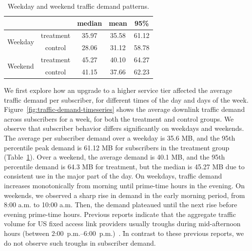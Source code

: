\begin{table}[t]
\centering
\begin{tabular}{ cc | ccc }\\\hline
                         &           & median & mean  & 95\%  \\\hline
\multirow{2}{*}{Weekday} & treatment & 35.97  & 35.58 & 61.12 \\
                         & control   & 28.06  & 31.12 & 58.78 \\\hline
\multirow{2}{*}{Weekend} & treatment & 45.27  & 40.10 & 64.27 \\
                         & control   & 41.15  & 37.66 & 62.23 \\\hline
\end{tabular}
\caption{Weekday and weekend traffic demand patterns.}
\label{tab:traffic-demand-description}
\end{table}

We first explore how an upgrade to a higher service tier affected the
average traffic demand per subscriber, for different times of the day
and days of the week.  Figure~\ref{fig:traffic-demand-timeseries} shows
the average downlink traffic demand across subscribers for a week, for
both the treatment and control groups. We observe that subscriber
behavior differs significantly on weekdays and weekends.  The average
per subscriber demand over a weekday is 35.6 MB, and the 95th percentile
peak demand is 61.12 MB for subscribers in the treatment group
(Table~\ref{tab:traffic-demand-description}).  Over a weekend, the
average demand is 40.1 MB, and the 95th percentile demand is 64.3 MB for
treatment, but the median is 45.27 MB due to consistent use in the major
part of the day.  On weekdays, traffic demand increases monotonically
from morning until prime-time hours in the evening. On weekends, we
observed a sharp rise in demand in the early morning period, from 8:00
a.m. to 10:00 a.m. Then, the demand plateaued until the next rise
before evening prime-time hours. Previous reports indicate that
the aggregate traffic volume for US fixed access link providers usually
troughs during mid-afternoon hours (between
2:00~p.m.--6:00~p.m.)~\cite{sandvine20141h}. \f{In contrast to these
  previous reports, we do not observe such troughs in 
subscriber demand.}


